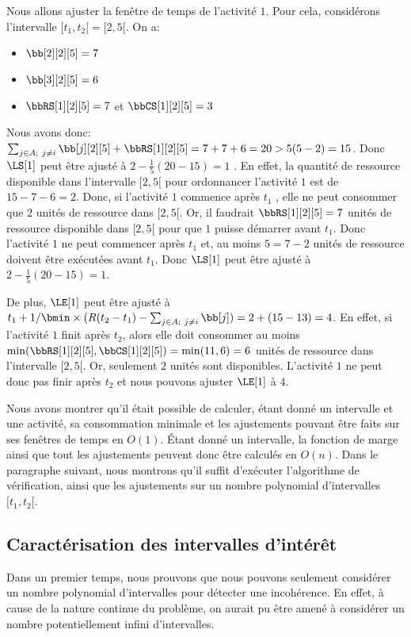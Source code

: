 \begin{ex}
Nous allons ajuster la fenêtre de temps de l'activité $1$. Pour cela,
considérons l'intervalle $[t_1,t_2[=[2,5[$. On a:
\begin{itemize}
  \item $\bb[2][2][5]=7$
  \item $\bb[3][2][5]=6$
  \item $\bbRS[1][2][5]=7$ et $\bbCS[1][2][5]=3$
  \end{itemize}
Nous avons donc: $\sum_{j\in A;\ j\neq i} \bb[j][2][5] +
\bbRS[1][2][5]= 7+7+6 =20 > 5 (5-2) =15$. Donc $\LS[1]$ peut être ajusté
à $ 2 -\frac{1}{5} (20-15) = 1$ .
En effet, la quantité de ressource disponible dans l'intervalle
$[2,5[$ pour ordonnancer l'activité $1$ est de $15-7-6=2$. Donc, si
l'activité $1$ commence après $t_1$ , elle ne peut consommer que $2$
unités de ressource dans $[2,5[$.  Or, il faudrait $\bbRS[1][2][5]= 7$
unités de ressource disponible dans $[2,5[$ pour que $1$ puisse
démarrer avant $t_1$. Donc l'activité $1$ ne peut commencer après $t_1$
et, au moins $5= 7-2$ unités de ressource doivent être exécutées avant
$t_1$. Donc $\LS[1]$ peut être ajusté à $2 - \frac{1}{5}(20-15) =1 $.

De plus, $\LE[1]$ peut être ajusté à $t_1 + 1/ \bmin \times (R(t_2-t_1) -
\sum_{j\in A;\ j\neq i} \bb[j] )= 2+(15-13)=4$. En effet, si l'activité
$1$ finit après $t_2$, alors elle doit consommer au moins
$\min(\bbRS[1][2][5],\bbCS[1][2][5])=\min(11,6)=6$ unités de ressource
dans l'intervalle $[2,5[$. Or, seulement $2$ unités sont
disponibles. L'activité $1$ ne peut donc pas finir après $t_2$ et nous
pouvons ajuster $\LE[1]$ à $4$.
\end{ex}

Nous avons montrer qu'il était possible de calculer, étant donné un
intervalle et une activité, sa consommation minimale et les
ajustements pouvant être faits sur ses fenêtres de temps en
$O(1)$. {\'E}tant donné un intervalle, la fonction de marge ainsi que
tout les ajustements peuvent donc être calculés en $O(n)$. Dans le
paragraphe suivant, nous montrons qu'il suffit d'exécuter l'algorithme
de vérification, ainsi que les ajustements sur un nombre polynomial
d'intervalles $[t_1,t_2[$.

\subsection{Caractérisation des intervalles d'intérêt}

Dans un premier temps, nous prouvons que nous pouvons seulement
considérer un nombre polynomial d'intervalles pour détecter une
incohérence. En effet, à cause de la nature continue du problème, on
aurait pu être amené à considérer un nombre potentiellement infini
d'intervalles. 

